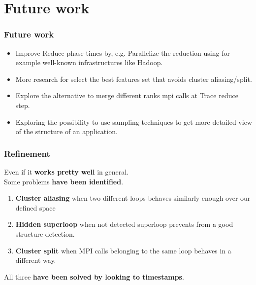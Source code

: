 \documentclass{beamer}
\begin{document}
\section{Future work}
\begin{frame}
	\frametitle{Future work}
	\begin{itemize}[<+->]
		\item Improve Reduce phase times by, e.g. Parallelize the reduction using for example well-known infrastructures like Hadoop.
		\item More research for select the best features set that avoids cluster aliasing/split.
		\item Explore the alternative to merge different ranks mpi calls at Trace reduce step.
		\item Exploring the possibility to use sampling techniques to get more detailed view of the structure of an application.
		
	\end{itemize}
\end{frame}

\begin{frame}
\titlepage
\end{frame}



\appendix

\begin{frame}
\frametitle{Refinement}
Even if it \textbf{works pretty well} in general. \\
Some problems \textbf{have been identified}.
\begin{enumerate}
	\item \textbf{Cluster aliasing} when two different loops behaves similarly enough over our defined space
	\item \textbf{Hidden superloop} when not detected superloop prevents from a good structure detection.
	\item \textbf{Cluster split} when MPI calls belonging to the same loop behaves in a different way.
\end{enumerate}
All three \textbf{have been solved by looking to timestamps}.

\end{frame}
\end{document}
